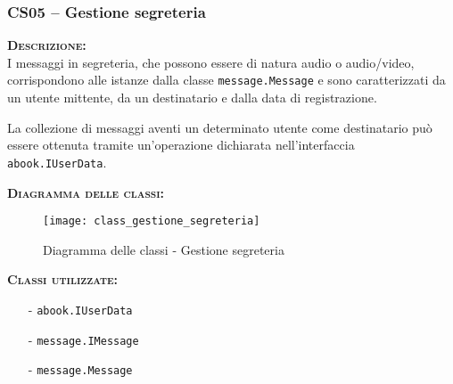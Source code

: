 \subsubsection{CS05 -- Gestione segreteria}
\begin{description}
	\item{\scshape\bfseries Descrizione:}\\
I messaggi in segreteria, che possono essere di natura audio o audio/video, corrispondono alle istanze dalla classe \texttt{message.Message} e sono caratterizzati da un utente mittente, da un destinatario e dalla data di registrazione.

La collezione di messaggi aventi un determinato utente come destinatario può essere ottenuta tramite un'operazione dichiarata nell'interfaccia \texttt{abook.IUserData}.

	\item{\scshape\bfseries Diagramma delle classi:}
\begin{figure}[H]
  \centering
  \texttt{[image: class\_gestione\_segreteria]}
  \caption{Diagramma delle classi - Gestione segreteria}\label{fig:gestionesegreteria}
\end{figure}	
	
	\item{\scshape\bfseries Classi utilizzate:}
	\begin{itemize}[noitemsep,nolistsep]
	  \item[-] \texttt{abook.IUserData}
		\item[-] \texttt{message.IMessage}
	  \item[-] \texttt{message.Message}
	\end{itemize}
\end{description}

